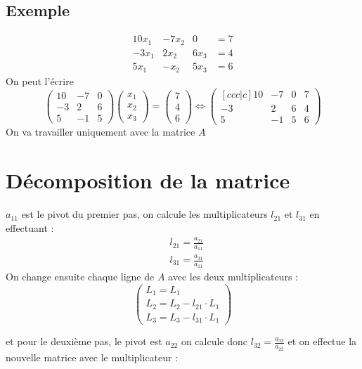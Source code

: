 \documentclass[11pt,a4paper]{report}
\begin{document}
\subsection*{Exemple}
$$
\begin{array}{cccc}
10x_1 & -7x_2 & 0 & =7 \\ 
-3x_1 & 2x_2 & 6x_3 & =4 \\ 
5x_1 & -x_2 & 5x_3 & =6
\end{array} 
$$
On peut l'écrire 
$$
\begin{pmatrix}
 10 & -7 & 0       \\
 -3 & 2 &   6     \\
 5 &  -1 &   5     
\end{pmatrix}
\begin{pmatrix}
 x_1    \\
 x_2    \\
 x_3     
\end{pmatrix}
=
\begin{pmatrix}
 7  \\
 4    \\
 6     
\end{pmatrix}
\Longleftrightarrow
\begin{pmatrix}[ccc|c]
 10 & -7 & 0   & 7    \\
 -3 & 2 &   6  & 4  \\
 5 &  -1 &   5 & 6  
\end{pmatrix}
$$
On va travailler uniquement avec la matrice $A$

\section{Décomposition de la matrice}

$a_{11}$ est le pivot du premier pas, on calcule les multiplicateurs $l_{21}$ et $l_{31}$ en effectuant :
\begin{align*}
& l_{21} = \frac{a_{21}}{a_{11}} \\
& l_{31} = \frac{a_{31}}{a_{11}}
\end{align*}
On change ensuite chaque ligne de $A$ avec les deux multiplicateurs :
$$
\begin{pmatrix}
L_1  = L_1\\
L_2  = L_2 - l_{21}\cdot L_1\\
L_3  = L_3 - l_{31}\cdot L_1
\end{pmatrix}
$$

et pour le deuxième pas, le pivot est $a_{22}$ on calcule donc $l_{32} = \frac{a_{32}}{a_{22}}$ et on effectue la nouvelle matrice avec le multiplicateur :
\end{document}
